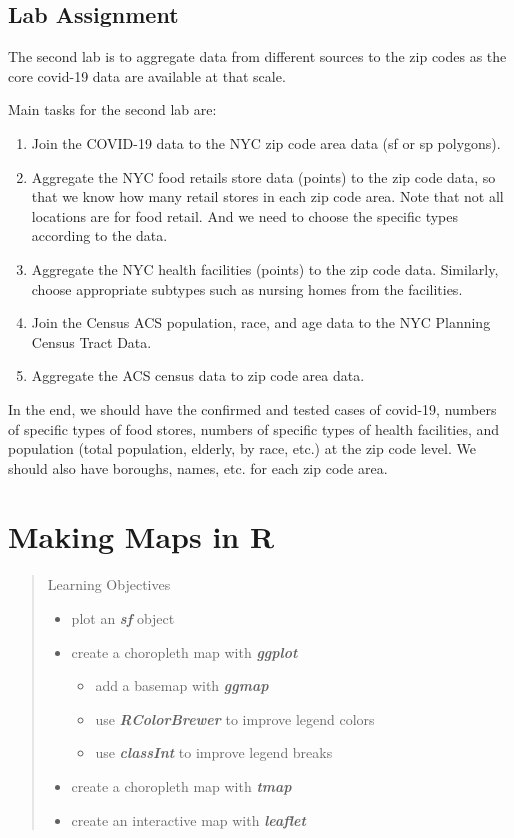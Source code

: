 \documentclass[
  11pt,
]{book}
\providecommand{\tightlist}{%
  \setlength{\itemsep}{0pt}\setlength{\parskip}{0pt}}
\begin{document}
\hypertarget{lab-assignment-1}{%
\section{Lab Assignment}\label{lab-assignment-1}}

The second lab is to aggregate data from different sources to the zip codes as the core covid-19 data are available at that scale.

Main tasks for the second lab are:

\begin{enumerate}
\def\labelenumi{\arabic{enumi}.}
\tightlist
\item
  Join the COVID-19 data to the NYC zip code area data (sf or sp polygons).
\item
  Aggregate the NYC food retails store data (points) to the zip code data, so that we know how many retail stores in each zip code area. Note that not all locations are for food retail. And we need to choose the specific types according to the data.
\item
  Aggregate the NYC health facilities (points) to the zip code data. Similarly, choose appropriate subtypes such as nursing homes from the facilities.
\item
  Join the Census ACS population, race, and age data to the NYC Planning Census Tract Data.
\item
  Aggregate the ACS census data to zip code area data.
\end{enumerate}

In the end, we should have the confirmed and tested cases of covid-19, numbers of specific types of food stores, numbers of specific types of health facilities, and population (total population, elderly, by race, etc.) at the zip code level. We should also have boroughs, names, etc. for each zip code area.

\hypertarget{mapping}{%
\chapter{Making Maps in R}\label{mapping}}

\begin{quote}
Learning Objectives

\begin{itemize}
\tightlist
\item
  plot an \textbf{\emph{sf}} object
\item
  create a choropleth map with \textbf{\emph{ggplot}}

  \begin{itemize}
  \tightlist
  \item
    add a basemap with \textbf{\emph{ggmap}}
  \item
    use \textbf{\emph{RColorBrewer}} to improve legend colors
  \item
    use \textbf{\emph{classInt}} to improve legend breaks
  \end{itemize}
\item
  create a choropleth map with \textbf{\emph{tmap}}
\item
  create an interactive map with \textbf{\emph{leaflet}}
\end{itemize}
\end{quote}
\end{document}
